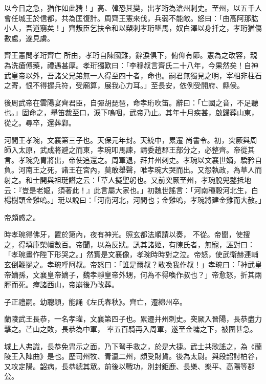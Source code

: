 \begin{pinyinscope}
 以今日之急，猶作如此猜！」高、韓恐其變，出孝珩為滄州刺史。至州，以五千人會任城王於信都，共為匡復計。周齊王憲來伐，兵弱不能敵。怒曰：「由高阿那肱小人，吾道窮矣！」齊叛臣乞扶令和以槊刺孝珩墜馬，奴白澤以身扦之，孝珩猶傷數處，遂見虜。



 齊王憲問孝珩齊亡
 所由，孝珩自陳國難，辭淚俱下，俯仰有節。憲為之改容，親為洗瘡傅藥，禮遇甚厚。孝珩獨歎曰：「李穆叔言齊氏二十八年，今果然矣！自神武皇帝以外，吾諸父兄弟無一人得至四十者，命也。嗣君無獨見之明，宰相非柱石之寄，恨不得握兵符，受廟算，展我心力耳。」至長安，依例受開府、縣侯。



 後周武帝在雲陽宴齊君臣，自彈胡琵琶，命孝珩吹笛。辭曰：「亡國之音，不足聽也。」固命之，舉笛裁至口，淚下嗚咽，武帝乃止。其年十月疾甚，啟歸葬山東，從之。尋卒，還葬鄴。



 河間王孝琬，文襄第三子也。天保元年封。天統中，累遷
 尚書令。初，突厥與周師入太原，武成將避之而東，孝琬叩馬諫，請委趙郡王部分之，必整齊。帝從其言。孝琬免胄將出，帝使追還之。周軍退，拜并州刺史。孝琬以文襄世嫡，驕矜自負。河南王之死，諸王在宮內，莫敢舉聲，唯孝琬大哭而出。又怨執政，為草人而射之。和士開與祖珽譖之云：「草人擬聖躬也。又前突厥至州，孝琬脫兜鍪抵地云：『豈是老嫗，須著此！』此言屬大家也。」初魏世謠言：「河南種穀河北生，白楊樹頭金雞嗚。」珽以說曰：「河南河北，河間也；金雞嗚，孝琬將建金雞而大赦。」



 帝頗惑之。



 時孝琬得佛牙，置於第內，夜有神光。照玄都法順請以奏，
 不從。帝聞，使搜之，得填庫槊幡數百。帝聞，以為反狀。訊其諸姬，有陳氏者，無寵，誣對曰：「孝琬畫作陛下形哭之。」然實是文襄像，孝琬時時對之泣。帝怒，使武衛赫連輔玄倒鞭撾之。孝琬呼阿叔。帝怒曰：「誰是爾叔？敢喚我作叔！」孝琬曰：「神武皇帝嫡孫，文襄皇帝嫡子，魏孝靜皇帝外甥，何為不得喚作叔也？」帝愈怒，折其兩脛而死。瘞諸西山，帝崩後乃改葬。



 子正禮嗣。幼聰穎，能誦《左氏春秋》。齊亡，遷綿州卒。



 蘭陵武王長恭，一名孝瓘，文襄第四子也。累遷并州刺史。突厥入晉陽，長恭盡力擊之。芒山之敗，長恭為中軍，
 率五百騎再入周軍，遂至金墉之下，被圍甚急。



 城上人弗識，長恭免胄示之面，乃下弩手救之，於是大捷。武士共歌謠之，為《蘭陵王入陣曲》是也。歷司州牧、青瀛二州，頗受財貨。後為太尉。與段韶討柏谷，又攻定陽。韶病，長恭總其眾。前後以戰功，別封鉅鹿、長樂、樂平、高陽等郡公。




\end{pinyinscope}
